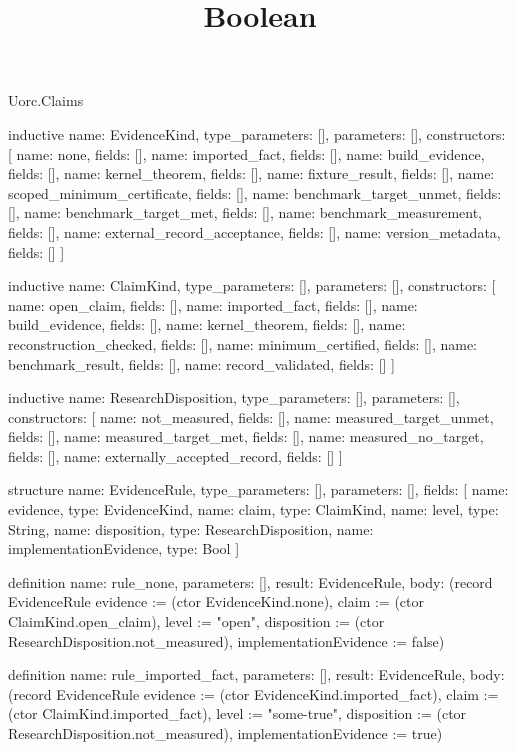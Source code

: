 \begin{lexlean}{Uorc.Claims}
\title{Boolean}
\begin{semanticmodule}
inductive{
  name: EvidenceKind,
  type_parameters: [],
  parameters: [],
  constructors: [
    {name: none, fields: []},
    {name: imported_fact, fields: []},
    {name: build_evidence, fields: []},
    {name: kernel_theorem, fields: []},
    {name: fixture_result, fields: []},
    {name: scoped_minimum_certificate, fields: []},
    {name: benchmark_target_unmet, fields: []},
    {name: benchmark_target_met, fields: []},
    {name: benchmark_measurement, fields: []},
    {name: external_record_acceptance, fields: []},
    {name: version_metadata, fields: []}
  ]
}

inductive{
  name: ClaimKind,
  type_parameters: [],
  parameters: [],
  constructors: [
    {name: open_claim, fields: []},
    {name: imported_fact, fields: []},
    {name: build_evidence, fields: []},
    {name: kernel_theorem, fields: []},
    {name: reconstruction_checked, fields: []},
    {name: minimum_certified, fields: []},
    {name: benchmark_result, fields: []},
    {name: record_validated, fields: []}
  ]
}

inductive{
  name: ResearchDisposition,
  type_parameters: [],
  parameters: [],
  constructors: [
    {name: not_measured, fields: []},
    {name: measured_target_unmet, fields: []},
    {name: measured_target_met, fields: []},
    {name: measured_no_target, fields: []},
    {name: externally_accepted_record, fields: []}
  ]
}

structure{
  name: EvidenceRule,
  type_parameters: [],
  parameters: [],
  fields: [
    {name: evidence, type: EvidenceKind},
    {name: claim, type: ClaimKind},
    {name: level, type: String},
    {name: disposition, type: ResearchDisposition},
    {name: implementationEvidence, type: Bool}
  ]
}

definition{
  name: rule_none,
  parameters: [],
  result: EvidenceRule,
  body: (record EvidenceRule {evidence := (ctor EvidenceKind.none), claim := (ctor ClaimKind.open_claim), level := "open", disposition := (ctor ResearchDisposition.not_measured), implementationEvidence := false})
}

definition{
  name: rule_imported_fact,
  parameters: [],
  result: EvidenceRule,
  body: (record EvidenceRule {evidence := (ctor EvidenceKind.imported_fact), claim := (ctor ClaimKind.imported_fact), level := "some-true", disposition := (ctor ResearchDisposition.not_measured), implementationEvidence := true})
}


\end{semanticmodule}
\end{lexlean}
